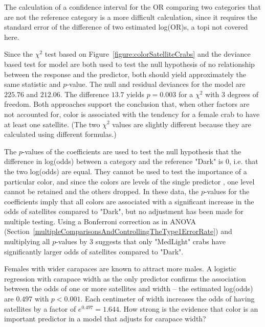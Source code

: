 The calculation of a confidence interval for the OR comparing two categories that are not the reference category is a more difficult calculation, since it requires the standard error of the difference of two estimated log(OR)s, a topi not covered here.

Since the $\chi^2$ test based on Figure~\ref{figure:colorSatelliteCrabs} and the deviance based test for model are both used to test the null hypothesis of no relationship between the response and the predictor, both should yield approximately the same statistic and $p$-value. The null and residual deviances for the model are $225.76$ and $212.06$.  The difference $13.7$ yields $p = 0.003$ for a $\chi^2$ with 3 degrees of freedom.  Both approaches support the conclusion that, when other factors are not accounted for, color is associated with the tendency for a female crab to have at least one satellite.  (The two $\chi^2$ values are slightly different because they are calculated using different formulas.)

The $p$-values of the coefficients are used to test the null hypothesis that the difference in log(odds) between a category and the reference "Dark" is 0, i.e. that the two log(odds) are equal.  They cannot be used to test the importance of a particular color, and since the colors are levels of the single predictor , one level cannot be retained and the others dropped.  In these data, the $p$-values for the coefficients imply that all colors are associated with a significant increase in the odds of satellites compared to "Dark", but no adjustment has been made for multiple testing.  Using a Bonferroni correction as in ANOVA (Section~\ref{multipleComparisonsAndControllingTheType1ErrorRate}) and multiplying all $p$-values by 3 suggests that only "MedLight" crabs have significantly larger odds of satellites compared to "Dark".

Females with wider carapaces are known to attract more males. A logistic regression with carapace width as the only predictor confirms the association between the odds of one or more satellites and width -- the estimated log(odds) are $0.497$ with $p < 0.001$. Each centimeter of width increases the odds of having satellites by a factor of $e^{0.497} = 1.644$.  How strong is the evidence that color is an important predictor in a model that adjusts for carapace width?

